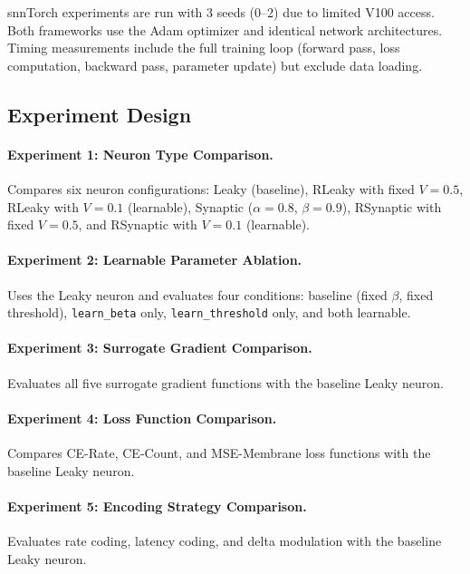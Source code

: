 \documentclass[11pt]{article}
\begin{document}
snnTorch experiments are run with 3 seeds (0--2) due to limited V100 access. Both frameworks use the Adam optimizer and identical network architectures. Timing measurements include the full training loop (forward pass, loss computation, backward pass, parameter update) but exclude data loading.

\subsection{Experiment Design}

\paragraph{Experiment 1: Neuron Type Comparison.}
Compares six neuron configurations: Leaky (baseline), RLeaky with fixed $V=0.5$, RLeaky with $V=0.1$ (learnable), Synaptic ($\alpha=0.8$, $\beta=0.9$), RSynaptic with fixed $V=0.5$, and RSynaptic with $V=0.1$ (learnable).

\paragraph{Experiment 2: Learnable Parameter Ablation.}
Uses the Leaky neuron and evaluates four conditions: baseline (fixed $\beta$, fixed threshold), \texttt{learn\_beta} only, \texttt{learn\_threshold} only, and both learnable.

\paragraph{Experiment 3: Surrogate Gradient Comparison.}
Evaluates all five surrogate gradient functions with the baseline Leaky neuron.

\paragraph{Experiment 4: Loss Function Comparison.}
Compares CE-Rate, CE-Count, and MSE-Membrane loss functions with the baseline Leaky neuron.

\paragraph{Experiment 5: Encoding Strategy Comparison.}
Evaluates rate coding, latency coding, and delta modulation with the baseline Leaky neuron.

\end{document}

